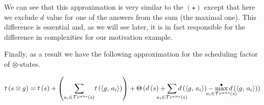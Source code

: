 We can see that this approximation is very similar to the $(\star)$ except that here we exclude $d$ value for one of the answers from the sum (the maximal one). This difference
is essential and, as we will see later, it is in fact responsible for the difference in complexities for our motivation example.

Finally, as a result we have the following approximation for the scheduling factor of $\otimes$-states.

\begin{corollary}
\label{lem:otimes_t_approximation}
\[
 t\,(s \otimes g)  =  t\,(s) + \left({\sum\limits_{a_i \in \tra{s}}} t\,(\taskst{g}{a_i})\right) +
 \Theta\,(d\,(s) + \smashoperator[lr]{\sum\limits_{a_i \in \tra{s}}} d\,(\taskst{g}{a_i}) - \smashoperator{\maxd\limits_{a_i \in \tra{s}}} d\,(\taskst{g}{a_i}))	
\]
\end{corollary}









